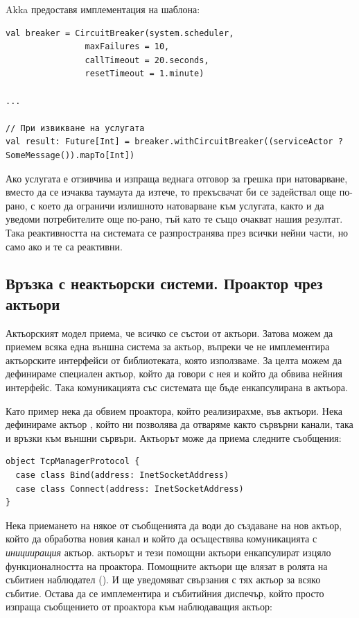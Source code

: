 Akka предоставя имплементация на шаблона:

\begin{lstlisting}[texcl=true]
val breaker = CircuitBreaker(system.scheduler, 
                maxFailures = 10, 
                callTimeout = 20.seconds, 
                resetTimeout = 1.minute)

...

// При извикване на услугата
val result: Future[Int] = breaker.withCircuitBreaker((serviceActor ? SomeMessage()).mapTo[Int])
\end{lstlisting}

Ако услугата е отзивчива и изпраща веднага отговор за грешка при натоварване, вместо да се изчаква таумаута да изтече, то прекъсвачат би се задействал още по-рано, с което да ограничи излишното натоварване към услугата, както и да уведоми потребителите още по-рано, тъй като те също очакват нашия резултат. Така реактивността на системата се разпространява през всички нейни части, но само ако и те са реактивни.

\subsection{Връзка с неактьорски системи. Проактор чрез актьори}

Актьорският модел приема, че всичко се състои от актьори. Затова можем да приемем всяка една външна система за актьор, въпреки че не имплементира актьорските интерфейси от библиотеката, която използваме. За целта можем да дефинираме специален актьор, който да говори с нея и който да обвива нейния интерфейс. Така комуникацията със системата ще бъде енкапсулирана в актьора.

Като пример нека да обвием проактора, който реализирахме, във актьори. Нека дефинираме актьор , който ни позволява да отваряме както сървърни канали, така и връзки към външни сървъри. Актьорът може да приема следните съобщения:

\begin{lstlisting}
object TcpManagerProtocol {
  case class Bind(address: InetSocketAddress)
  case class Connect(address: InetSocketAddress)
}
\end{lstlisting}

Нека приемането на някое от съобщенията да води до създаване на нов актьор, който да обработва новия канал и който да осъществява комуникацията с \emph{иницииращия} актьор.  актьорът и тези помощни актьори енкапсулират изцяло функционалността на проактора. Помощните актьори ще влязат в ролята на събитиен наблюдател (). И ще уведомяват свързания с тях актьор за всяко събитие. Остава да се имплементира и събитийния диспечър, който просто изпраща съобщението от проактора към наблюдаващия актьор:


